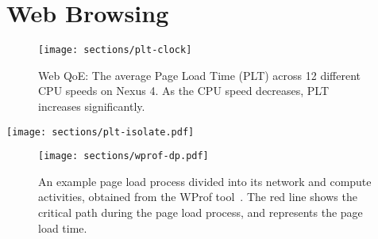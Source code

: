 
\section{Web Browsing} \label{label:web}

\begin{figure}[t]
  \centering
  \texttt{[image: sections/plt-clock]}
    \caption{Web QoE: The average Page Load Time (PLT) across 12 different CPU speeds on Nexus 4. As the CPU speed decreases, PLT increases significantly. }
  \label{fig:plt_clock}
\end{figure}

\begin{figure*}[t]
  \centering
  \texttt{[image: sections/plt-isolate.pdf]}
    \caption{Isolating the effect of network activities and compute activities as the CPU speed changes. The PLT of the Web page is the sum of the time taken for compute activities and the time taken for the network activities on the critical path~\cite{wang2013demystifying,nejati2016depth}. The PLT is the same as that shown in Figure~\ref{fig:plt_clock}. As the CPU slows down, the compute activities are affected more than the network activities. }\vspace{-0.2in}
  \label{fig:plt_isolate}
\end{figure*}

\begin{figure}[t]
  \centering
  \texttt{[image: sections/wprof-dp.pdf]}
    \caption{An example page load process divided into its network and compute activities, obtained from the WProf tool~\cite{wang2013demystifying,nejati2016depth}. The red line shows the critical path during the page load process, and represents the page load time. }
  \label{fig:wprof-dp}
\end{figure}

